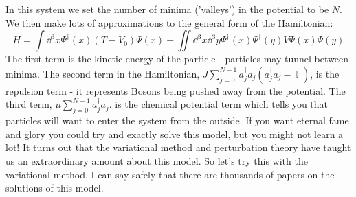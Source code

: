 \documentclass{article}
\DeclareMathOperator{\II}{\mathbb{I}}
\begin{document}
In this system we set the number of minima ('valleys') in the potential to be $N$. We then make lots of approximations to the general form of the Hamiltonian:
\[H = \int \dd^3 x \Psi^\dagger(x)(T-V_0)\Psi(x) + \iint \dd^3 x \dd^3 y \Psi^\dagger(x)\Psi^\dagger(y)V\Psi(x)\Psi(y)\]
The first term is the kinetic energy of the particle - particles may tunnel between minima. The second term in the Hamiltonian, $J\sum_{j=0}^{N-1}a_j^\dagger a_j(a_j^\dagger a_j - \II)$, is the repulsion term - it represents Bosons being pushed away from the potential. The third term, $ \mu\sum_{j=0}^{N-1}a_j^\dagger a_j$. is the chemical potential term which tells you that particles will want to enter the system from the outside. If you want eternal fame and glory you could try and exactly solve this model, but you might not learn a lot! It turns out that the variational method and perturbation theory have taught us an extraordinary amount about this model. So let's try this with the variational method. I can say safely that there are thousands of papers on the solutions of this model.
\end{document}
